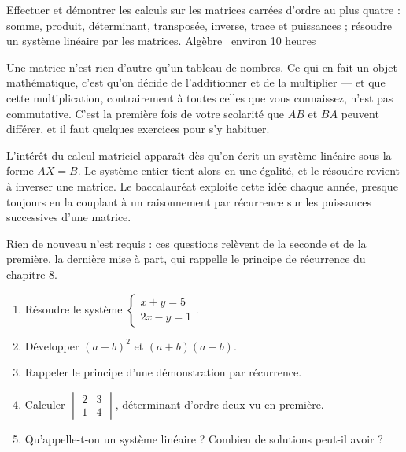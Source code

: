   {Effectuer et démontrer les calculs sur les matrices carrées d'ordre au plus
   quatre : somme, produit, déterminant, transposée, inverse, trace et
   puissances ; résoudre un système linéaire par les matrices.}
  {Algèbre \textbullet\ environ 10 heures}

Une matrice n'est rien d'autre qu'un tableau de nombres. Ce qui en fait un
objet mathématique, c'est qu'on décide de l'additionner et de la multiplier —
et que cette multiplication, contrairement à toutes celles que vous connaissez,
n'est pas commutative. C'est la première fois de votre scolarité que $AB$ et
$BA$ peuvent différer, et il faut quelques exercices pour s'y habituer.

L'intérêt du calcul matriciel apparaît dès qu'on écrit un système linéaire
sous la forme $AX = B$. Le système entier tient alors en une égalité, et le
résoudre revient à inverser une matrice. Le baccalauréat exploite cette idée
chaque année, presque toujours en la couplant à un raisonnement par récurrence
sur les puissances successives d'une matrice.

\begin{revision}
Rien de nouveau n'est requis : ces questions relèvent de la seconde et de la
première, la dernière mise à part, qui rappelle le principe de récurrence du
chapitre 8.

\begin{enumerate}[label=\textbf{\arabic*.}, leftmargin=*, itemsep=0.35em]
  \item Résoudre le système $\begin{cases} x+y = 5 \\ 2x-y = 1 \end{cases}$.
  \item Développer $(a+b)^{2}$ et $(a+b)(a-b)$.
  \item Rappeler le principe d'une démonstration par récurrence.
  \item Calculer $\begin{vmatrix} 2 & 3 \\ 1 & 4 \end{vmatrix}$, déterminant
        d'ordre deux vu en première.
  \item Qu'appelle-t-on un système linéaire ? Combien de solutions peut-il
        avoir ?
\end{enumerate}
\end{revision}

